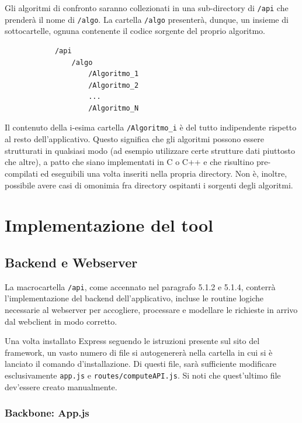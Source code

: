         \vspace{3mm}
        
        Gli algoritmi di confronto saranno collezionati in una sub-directory di \verb|/api| che prenderà il nome di \verb|/algo|. La cartella \verb|/algo| presenterà, dunque, un insieme di sottocartelle, ognuna contenente il codice sorgente del proprio algoritmo.
        
       \begin{verbatim} 
            /api         
                /algo
                    /Algoritmo_1
                    /Algoritmo_2
                    ...
                    /Algoritmo_N
        \end{verbatim}
        
        Il contenuto della i-esima cartella \verb|/Algoritmo_i| è del tutto indipendente rispetto al resto dell'applicativo. Questo significa che gli algoritmi possono essere strutturati in qualsiasi modo (ad esempio utilizzare certe strutture dati piuttosto che altre), a patto che siano implementati in C o C++ e che risultino pre-compilati ed eseguibili una volta inseriti nella propria directory. Non è, inoltre, possibile avere casi di omonimia fra directory ospitanti i sorgenti degli algoritmi.
        
\section{Implementazione del tool}

\subsection{Backend e Webserver}
    
La macrocartella \verb|/api|, come accennato nel paragrafo 5.1.2 e 5.1.4, conterrà l'implementazione del backend dell'applicativo, incluse le routine logiche necessarie al webserver per accogliere, processare e modellare le richieste in arrivo dal webclient in modo corretto.
    
Una volta installato Express seguendo le istruzioni presente sul sito del framework, un vasto numero di file si autogenererà nella cartella in cui si è lanciato il comando d'installazione. Di questi file, sarà sufficiente modificare esclusivamente \verb|app.js| e \verb|routes/computeAPI.js|. Si noti che quest'ultimo file dev'essere creato manualmente. 

\subsubsection{Backbone: App.js}

